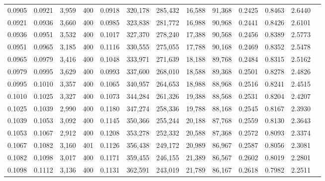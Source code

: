 \begin{tabular}{rrrrrrrrrrrrr}
0.0905 & 0.0921 &  3,959 &   400 &                                     0.0918 & 320,178 & 285,432 &  16,588 &  91,368 & 0.2425 & 0.8463 & 2.6440 \\
0.0921 & 0.0936 &  3,660 &   400 &                                     0.0985 & 323,838 & 281,772 &  16,988 &  90,968 & 0.2441 & 0.8426 & 2.6101 \\
0.0936 & 0.0951 &  3,532 &   400 &                                     0.1017 & 327,370 & 278,240 &  17,388 &  90,568 & 0.2456 & 0.8389 & 2.5773 \\
0.0951 & 0.0965 &  3,185 &   400 &                                     0.1116 & 330,555 & 275,055 &  17,788 &  90,168 & 0.2469 & 0.8352 & 2.5478 \\
0.0965 & 0.0979 &  3,416 &   400 &                                     0.1048 & 333,971 & 271,639 &  18,188 &  89,768 & 0.2484 & 0.8315 & 2.5162 \\
0.0979 & 0.0995 &  3,629 &   400 &                                     0.0993 & 337,600 & 268,010 &  18,588 &  89,368 & 0.2501 & 0.8278 & 2.4826 \\
0.0995 & 0.1010 &  3,357 &   400 &                                     0.1065 & 340,957 & 264,653 &  18,988 &  88,968 & 0.2516 & 0.8241 & 2.4515 \\
0.1010 & 0.1025 &  3,327 &   400 &                                     0.1073 & 344,284 & 261,326 &  19,388 &  88,568 & 0.2531 & 0.8204 & 2.4207 \\
0.1025 & 0.1039 &  2,990 &   400 &                                     0.1180 & 347,274 & 258,336 &  19,788 &  88,168 & 0.2545 & 0.8167 & 2.3930 \\
0.1039 & 0.1053 &  3,092 &   400 &                                     0.1145 & 350,366 & 255,244 &  20,188 &  87,768 & 0.2559 & 0.8130 & 2.3643 \\
0.1053 & 0.1067 &  2,912 &   400 &                                     0.1208 & 353,278 & 252,332 &  20,588 &  87,368 & 0.2572 & 0.8093 & 2.3374 \\
0.1067 & 0.1082 &  3,160 &   401 &                                     0.1126 & 356,438 & 249,172 &  20,989 &  86,967 & 0.2587 & 0.8056 & 2.3081 \\
0.1082 & 0.1098 &  3,017 &   400 &                                     0.1171 & 359,455 & 246,155 &  21,389 &  86,567 & 0.2602 & 0.8019 & 2.2801 \\
0.1098 & 0.1112 &  3,136 &   400 &                                     0.1131 & 362,591 & 243,019 &  21,789 &  86,167 & 0.2618 & 0.7982 & 2.2511 \\

\end{tabular}
